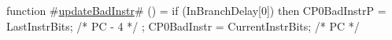 function #\hyperref[zupdateBadInstr]{updateBadInstr}# () = {
  if (InBranchDelay[0]) then {
    CP0BadInstrP = LastInstrBits; /* PC - 4 */
  };
  CP0BadInstr = CurrentInstrBits; /* PC */
}
